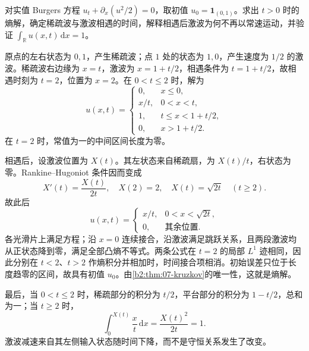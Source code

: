 \begin{optionalexercise}\label{b2:ex:07-expansion-nonunique}
对实值 Burgers 方程 \(u_t+\partial_x(u^2/2)=0\)，取初值
\(u_0=\mathbf1_{(0,1)}\)。求出 \(t>0\) 时的熵解，确定稀疏波与激波相遇的时间，解释相遇后激波为何不再以常速运动，并验证
\(\int_{\mathbb R}u(x,t)\,\mathrm dx=1\)。
\end{optionalexercise}
\begin{solution}
原点的左右状态为 \(0,1\)，产生稀疏波；点 \(1\) 处的状态为 \(1,0\)，产生速度为 \(1/2\) 的激波。稀疏波右边缘为 \(x=t\)，激波为 \(x=1+t/2\)，相遇条件为 \(t=1+t/2\)，故相遇时刻为 \(t=2\)，位置为 \(x=2\)。在 \(0<t\leq2\) 时，解为
\[
 u(x,t)=
 \begin{cases}
 0,&x\leq0,\\
 x/t,&0<x<t,\\
 1,&t\leq x<1+t/2,\\
 0,&x>1+t/2.
 \end{cases}
\]
在 \(t=2\) 时，常值为一的中间区间长度为零。

相遇后，设激波位置为 \(X(t)\)。其左状态来自稀疏扇，为 \(X(t)/t\)，右状态为零。Rankine--Hugoniot 条件因而变成
\[
 X'(t)=\frac{X(t)}{2t},\quad X(2)=2,
 \quad X(t)=\sqrt{2t}\quad(t\geq2).
\]
故此后
\[
 u(x,t)=\begin{cases}x/t,&0<x<\sqrt{2t},\\0,&\text{其余位置}.\end{cases}
\]
各光滑片上满足方程；沿 \(x=0\) 连续接合，沿激波满足跳跃关系，且两段激波均从正状态降到零，满足全部凸熵不等式。两条公式在 \(t=2\) 的局部 \(L^1\) 迹相同，因此分别在 \(t<2\)、\(t>2\) 作熵积分并相加时，时间接合项相消。初始误差只位于长度趋零的区间，故具有初值 \(u_0\)。由\cref{b2:thm:07-kruzkov}的唯一性，这就是熵解。

最后，当 \(0<t\leq2\) 时，稀疏部分的积分为 \(t/2\)，平台部分的积分为 \(1-t/2\)，总和为一；当 \(t\geq2\) 时，
\[
 \int_0^{X(t)}\frac{x}{t}\,\mathrm dx
 =\frac{X(t)^2}{2t}=1.
\]
激波减速来自其左侧输入状态随时间下降，而不是守恒关系发生了改变。
\end{solution}

